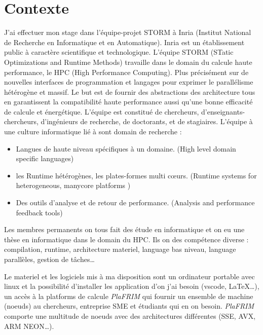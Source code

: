 \section{Contexte}
J'ai effectuer mon stage dans l'équipe-projet STORM à Inria (Institut National de
Recherche en Informatique et en Automatique). Inria est un établissement public à
caractère scientifique et technologique.
L'équipe STORM (STatic Optimizations and Runtime Methods) travaille dans le domain du
calcule haute performance, le HPC (High Performance Computing). Plus précisément sur
de  nouvelles interfaces de programmation et langages pour exprimer le parallélisme
hétérogène et massif. Le but est de fournir des abstractions des architecture tous en
garantissent la compatibilité haute performance aussi qu'une bonne efficacité de calcule
et énergétique.
L'équipe est constitué de chercheurs, d'enseignants-chercheurs, d'ingénieurs de recherche,
de doctorants, et de stagiaires.
L'équipe à une culture informatique lié à sont domain de recherche :

\begin{itemize}
  \item Langues de haute niveau spécifiques à un domaine. (High level domain specific languages)
  \item les Runtime hétérogènes, les plates-formes multi cœurs. (Runtime systems for heterogeneous, manycore platforms )
  \item Des outils d'analyse et de retour de performance. (Analysis and performance feedback tools)
\end{itemize}

Les membres permanents on tous fait des étude en informatique et on eu une thèse en
informatique dans le domain du HPC. Ils on des compétence diverse : compilation, runtime,
architecture materiel, language bas niveau, language parallèles, gestion de tâches\dots

Le materiel et les logiciels mis à ma disposition sont un ordinateur portable avec linux
et la possibilité d'installer les application d'on j'ai besoin (vscode, \LaTeX\dots), un
accès à la platforms de calcule \emph{PlaFRIM} qui fournir un ensemble de machine (noeuds)
au chercheurs, entreprise SME et étudiants qui en on besoin. \emph{PlaFRIM} comporte une
multitude de noeuds avec des architectures différentes (SSE, AVX, ARM NEON\dots).
